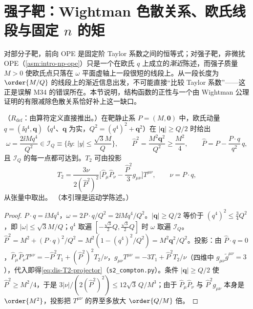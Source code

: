 \section{强子靶：Wightman 色散关系、欧氏线段与固定 $n$ 的矩}\label{sec:dis-np}

对部分子靶，前向 OPE 是固定阶 Taylor 系数之间的恒等式；对强子靶，非微扰 OPE（\cref{asm:intro-np-ope}）只是一个在欧氏 $q$ 上成立的\emph{渐近}陈述，而强子质量 $M>0$ 使欧氏点只落在 $\omega$ 平面虚轴上一段很短的线段上。从一段长度为 $\order{M/Q}$ 的线段上的渐近信息出发，不可能直接“比较 Taylor 系数”——这正是误解 M34 的错误所在。本节说明，结构函数的正性与一个由 Wightman 公理证明的有限减除色散关系恰好补上这一缺口。

\begin{lemma}\label{lem:dis-euclid-segment}
（$R_{\mathrm{def}}$：由算符定义直接推出。）在靶静止系 $P=(M,\mathbf 0)$ 中，欧氏动量 $q=(\ii q^4,\mathbf q)$（$q^4$、$\mathbf q$ 为实，$Q^2=(q^4)^2+\mathbf q^2$）在 $|\mathbf q|\ge Q/2$ 时给出
\begin{equation}\label{eq:dis-segment}
\omega=\frac{2\ii Mq^4}{Q^2}\in\mathcal I_Q\equiv\Big\{\ii y:\ |y|\le\frac{\sqrt3M}{Q}\Big\},\qquad \hat P^2=\frac{M^2\mathbf q^2}{Q^2}\ge\frac{M^2}4,\qquad \hat P=P-\frac{P\cdot q}{q^2}\,q,
\end{equation}
且 $\mathcal I_Q$ 的每一点都可达到。$T_2$ 可由投影
\begin{equation}\label{eq:dis-T2-projector}
T_2=\frac{3\nu}{2(\hat P^2)^2}\Big[\hat P_\mu\hat P_\nu-\frac{\hat P^2}3g_{\mu\nu}\Big]T^{\mu\nu},\qquad \nu=P\cdot q,
\end{equation}
从张量中取出。%
（本引理是运动学陈述。）
\end{lemma}

\begin{proof}
$P\cdot q=\ii Mq^4$，$\omega=2P\cdot q/Q^2=2\ii Mq^4/Q^2$。$|\mathbf q|\ge Q/2$ 等价于 $(q^4)^2\le\frac34Q^2$，即 $|\omega|\le\sqrt3M/Q$；$q^4$ 取遍 $[-\frac{\sqrt3}2Q,\frac{\sqrt3}2Q]$ 时 $\omega$ 取遍 $\mathcal I_Q$。$\hat P^2=M^2+(P\cdot q)^2/Q^2=M^2(1-(q^4)^2/Q^2)=M^2\mathbf q^2/Q^2$。投影：由 $\hat P\cdot q=0$，$\hat P_\mu\hat P_\nu T^{\mu\nu}=-\hat P^2T_1+(\hat P^2)^2T_2/\nu$，$g_{\mu\nu}T^{\mu\nu}=-3T_1+\hat P^2T_2/\nu$（四维中 $g_{\mu\nu}\tilde g^{\mu\nu}=3$），代入即得\cref{eq:dis-T2-projector}（\texttt{s2\_compton.py}）。条件 $|\mathbf q|\ge Q/2$ 使 $\hat P^2\ge M^2/4$，于是 $3|\nu|/(2(\hat P^2)^2)\le12\sqrt3\,Q/M^3$；由于 $\hat P_\mu\hat P_\nu$ 与 $\hat P^2g_{\mu\nu}$ 本身是 $\order{M^2}$，投影把 $T^{\mu\nu}$ 的界至多放大 $\order{Q/M}$ 倍。
\end{proof}

